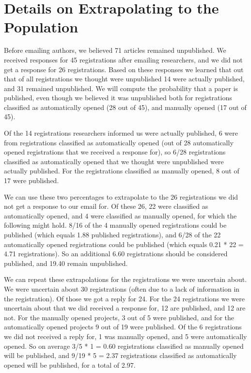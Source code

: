 \documentclass[
  ,jou, a4paper,floatsintext]{apa6}
\begin{document}
\section{Details on Extrapolating to the Population}\label{details-on-extrapolating-to-the-population}

Before emailing authors, we believed 71 articles remained unpublished. We received responses for 45 registrations after emailing researchers, and we did not get a response for 26 registrations. Based on these responses we learned that out that of all registrations we thought were unpublished 14 were actually published, and 31 remained unpublished. We will compute the probability that a paper is published, even though we believed it was unpublished both for registrations classified as automatically opened (28 out of 45), and manually opened (17 out of 45).

Of the 14 registrations researchers informed us were actually published, 6 were from registrations classified as automatically opened (out of 28 automatically opened registrations that we received a response for), so 6/28 registrations classified as automatically opened that we thought were unpublished were actually published. For the registrations classified as manually opened, 8 out of 17 were published.

We can use these two percentages to extrapolate to the 26 registrations we did not get a response to our email for. Of these 26, 22 were classified as automatically opened, and 4 were classified as manually opened, for which the following might hold. 8/16 of the 4 manually opened registrations could be published (which equals 1.88 published registrations), and 6/28 of the 22 automatically opened registrations could be published (which equals 0.21 * 22 = 4.71 registrations). So an additional 6.60 registrations should be considered published, and 19.40 remain unpublished.

We can repeat these extrapolations for the registrations we were uncertain about. We were uncertain about 30 registrations (often due to a lack of information in the registration). Of those we got a reply for 24. For the 24 registrations we were uncertain about that we did received a response for, 12 are published, and 12 are not. For the manually opened projects, 3 out of 5 were published, and for the automatically opened projects 9 out of 19 were published. Of the 6 registrations we did not received a reply for, 1 was manually opened, and 5 were automatically opened. So on average 3/5 * 1 = 0.60 registrations classified as manually opened will be published, and 9/19 * 5 = 2.37 registrations classified as automatically opened will be published, for a total of 2.97.
\end{document}
